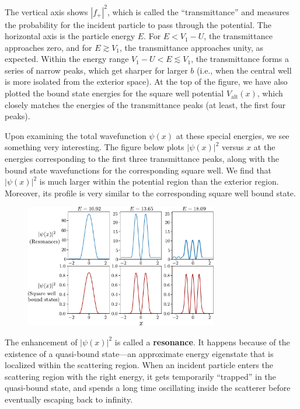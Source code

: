 \documentclass[pra,12pt]{revtex4}
\begin{document}
The vertical axis shows $|f_+|^2$, which is called the
``transmittance'' and measures the probability for the incident
particle to pass through the potential.  The horizontal axis is the
particle energy $E$.  For $E < V_1-U$, the transmittance approaches
zero, and for $E \gtrsim V_1$, the transmittance approaches unity, as
expected.  Within the energy range $V_1-U < E \lesssim V_1$, the
transmittance forms a series of narrow peaks, which get sharper for
larger $b$ (i.e., when the central well is more isolated from the
exterior space).  At the top of the figure, we have also plotted the
bound state energies for the square well potential
$V_{\mathrm{alt}}(x)$, which closely matches the energies of the
transmittance peaks (at least, the first four peaks).

Upon examining the total wavefunction $\psi(x)$ at these special
energies, we see something very interesting.  The figure below plots
$|\psi(x)|^2$ versus $x$ at the energies corresponding to the first
three transmittance peaks, along with the bound state wavefunctions
for the corresponding square well.  We find that $|\psi(x)|^2$ is much
larger within the potential region than the exterior region.
Moreover, its profile is very similar to the corresponding square well
bound state.

\begin{figure}[h]
  \centering\includegraphics[width=0.75\textwidth]{resonancewavefunctions}
\end{figure}

The enhancement of $|\psi(x)|^2$ is called a \textbf{resonance}.  It
happens because of the existence of a quasi-bound state---an
approximate energy eigenstate that is localized within the scattering
region.  When an incident particle enters the scattering region with
the right energy, it gets temporarily ``trapped'' in the quasi-bound
state, and spends a long time oscillating inside the scatterer before
eventually escaping back to infinity.
\end{document}
